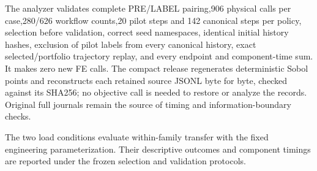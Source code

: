 \documentclass[suppldata]{interact}
\begin{document}
\endgroup

The analyzer validates complete PRE/LABEL pairing,906 physical calls per case,280/626 workflow counts,20 pilot steps and 142 canonical steps per policy, selection before validation, correct seed namespaces, identical initial history hashes, exclusion of pilot labels from every canonical history, exact selected/portfolio trajectory replay, and every endpoint and component-time sum. It makes zero new FE calls. The compact release regenerates deterministic Sobol points and reconstructs each retained source JSONL byte for byte, checked against its SHA256; no objective call is needed to restore or analyze the records. Original full journals remain the source of timing and information-boundary checks.

The two load conditions evaluate within-family transfer with the fixed engineering parameterization. Their descriptive outcomes and component timings are reported under the frozen selection and validation protocols.




















\end{document}
